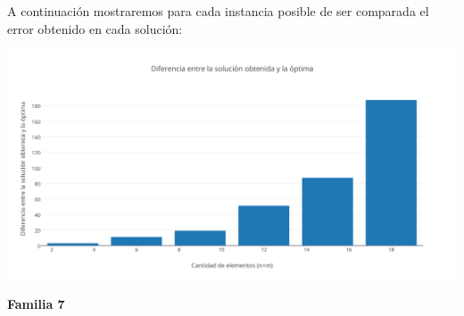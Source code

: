A continuaci\'on mostraremos para cada instancia posible de ser comparada el error obtenido en cada soluci\'on:

\vspace*{0.3cm} \vspace*{0.3cm}
  \begin{center}
\includegraphics[scale=0.60]{./EJ2/sinOrden.png}
  \end{center}
  \vspace*{0.3cm}
  
\begin{center}
\textbf{Familia 7}
\end{center}

